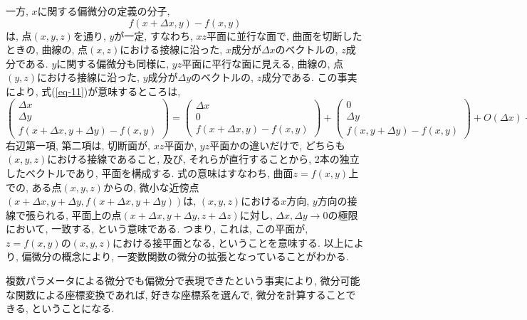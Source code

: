 \documentclass{jsarticle}
\begin{document}
一方, $x$に関する偏微分の定義の分子, 
\[
  f(x + \Delta x, y) - f(x, y)
\]
は, 点$(x, y, z)$を通り, $y$が一定, すなわち, $xz$平面に並行な面で, 曲面を切断したときの, 曲線の, 点$(x, z)$における接線に沿った, $x$成分が$\Delta x$のベクトルの, $z$成分である. 
$y$に関する偏微分も同様に, $yz$平面に平行な面に見える, 曲線の, 点$(y, z)$における接線に沿った, $y$成分が$\Delta y$のベクトルの, $z$成分である. 
この事実により, 式(\ref{eq-11})が意味するところは, 
\begin{equation}
  \begin{pmatrix}
    \Delta x \\
    \Delta y \\
    f(x + \Delta x, y + \Delta y) - f(x, y)
  \end{pmatrix}
  =
  \begin{pmatrix}
    \Delta x \\
    0 \\
    f(x + \Delta x, y) - f(x, y)
  \end{pmatrix}
  +
  \begin{pmatrix}
    0 \\
    \Delta y \\
    f(x, y + \Delta y) - f(x, y)
  \end{pmatrix}
  +
  O(\Delta x) + O(\Delta y)
\end{equation}
右辺第一項, 第二項は, 切断面が, $xz$平面か, $yz$平面かの違いだけで, どちらも$(x, y, z)$における接線であること, 及び, それらが直行することから, 2本の独立したベクトルであり, 平面を構成する. 
式の意味はすなわち, 曲面$z = f(x, y)$上での, ある点$(x, y, z)$からの, 微小な近傍点$(x + \Delta x, y + \Delta y, f(x + \Delta x, y + \Delta y))$は, 
$(x, y, z)$における$x$方向, $y$方向の接線で張られる, 平面上の点$(x + \Delta x, y + \Delta y, z + \Delta z)$に対し, $\Delta x, \Delta y \to 0$の極限において, 一致する, という意味である. 
つまり, これは, この平面が, $z = f(x, y)$の$(x, y, z)$における接平面となる, ということを意味する. 
以上により, 偏微分の概念により, 一変数関数の微分の拡張となっていることがわかる. 

複数パラメータによる微分でも偏微分で表現できたという事実により, 微分可能な関数による座標変換であれば, 好きな座標系を選んで, 微分を計算することできる, ということになる. 
\end{document}
